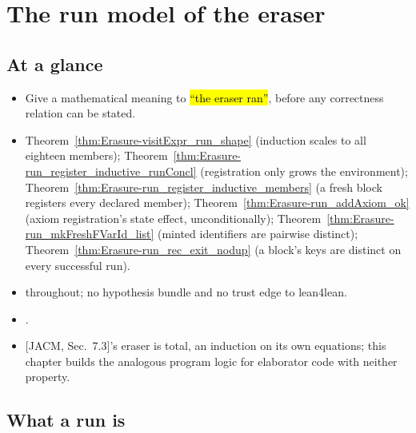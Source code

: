 \chapter{The run model of the eraser}
\label{chap:run}

\section*{At a glance}
\begin{itemize}
\item {} Give a mathematical meaning to \hl{``the eraser ran''}, before any correctness
relation can be stated.
\item {} Theorem~\ref{thm:Erasure-visitExpr_run_shape} (induction scales to all
eighteen members); Theorem~\ref{thm:Erasure-run_register_inductive_runConcl} (registration only
grows the environment); Theorem~\ref{thm:Erasure-run_register_inductive_members} (a fresh block
registers every declared member); Theorem~\ref{thm:Erasure-run_addAxiom_ok} (axiom registration's
state effect, unconditionally); Theorem~\ref{thm:Erasure-run_mkFreshFVarId_list} (minted
identifiers are pairwise distinct); Theorem~\ref{thm:Erasure-run_rec_exit_nodup} (a block's keys
are distinct on every successful run).
\item {} \stProved{} throughout; no hypothesis bundle and no trust edge to lean4lean.
\item {} .
\item {} [JACM, Sec.~7.3]'s eraser is total, an induction on its own equations; this chapter
builds the analogous program logic for elaborator code with neither property.
\end{itemize}

\section{What a run is}
\label{sec:run:spelling}

